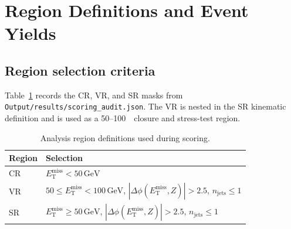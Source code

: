 \documentclass[11pt,a4paper,twocolumn]{article}
\newcommand{\GeV}{\text{GeV}}
\newcommand{\MET}{\ensuremath{E_{\mathrm{T}}^{\mathrm{miss}}}}
\begin{document}
\begin{table}[H]
\centering
\caption{High-quantile tail rules used by the SM cleaner. A positive rule bounds the feature below by zero and above by the estimated cap; a symmetric rule applies \([-\mathrm{cap},+\mathrm{cap}]\).}
\label{tab:appendix-cleaning-tail}
\end{table}

\clearpage
\section{Region Definitions and Event Yields}
\label{app:regions-yields}

\subsection{Region selection criteria}
\label{app:region-criteria}

Table~\ref{tab:appendix-region-criteria} records the CR, VR, and SR masks from
\texttt{Output/results/scoring\_audit.json}. The VR is nested in the SR kinematic
definition and is used as a 50--100~\GeV\ closure and stress-test region.

\begin{table}[h]
\centering
\caption{Analysis region definitions used during scoring.}
\label{tab:appendix-region-criteria}

\begin{tabular}{ll}
\toprule
Region & Selection \\
\midrule
CR & \(\MET < 50\,\GeV\) \\
VR & \(50 \le \MET < 100\,\GeV\), \(|\Delta\phi(\MET,Z)|>2.5\), \(n_{\mathrm{jets}}\le 1\) \\
SR & \(\MET \ge 50\,\GeV\), \(|\Delta\phi(\MET,Z)|>2.5\), \(n_{\mathrm{jets}}\le 1\) \\
\bottomrule
\end{tabular}

\end{table}
\end{document}
